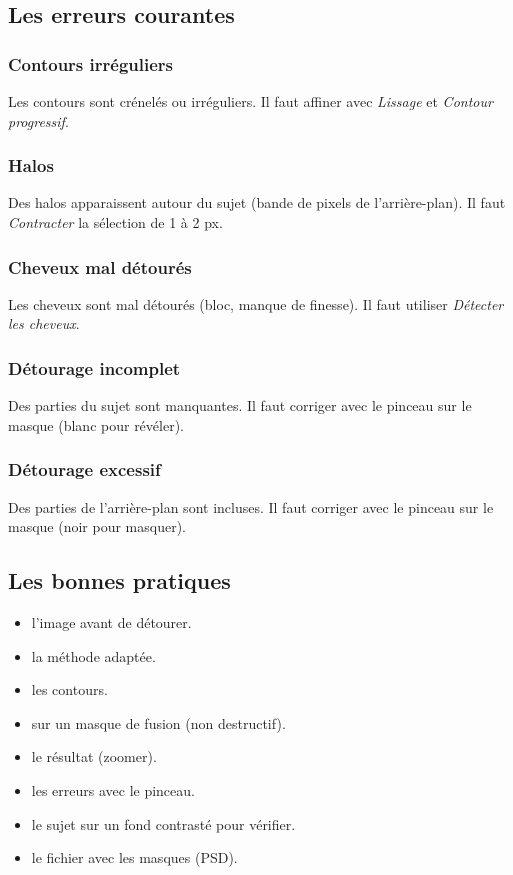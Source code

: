 \subsection{Les erreurs courantes}

\subsubsection{Contours irréguliers}

Les contours sont crénelés ou irréguliers. Il faut affiner avec \emph{Lissage} et \emph{Contour progressif}.

\subsubsection{Halos}

Des halos apparaissent autour du sujet (bande de pixels de l'arrière-plan). Il faut \emph{Contracter} la sélection de 1 à 2 px.

\subsubsection{Cheveux mal détourés}

Les cheveux sont mal détourés (bloc, manque de finesse). Il faut utiliser \emph{Détecter les cheveux}.

\subsubsection{Détourage incomplet}

Des parties du sujet sont manquantes. Il faut corriger avec le pinceau sur le masque (blanc pour révéler).

\subsubsection{Détourage excessif}

Des parties de l'arrière-plan sont incluses. Il faut corriger avec le pinceau sur le masque (noir pour masquer).

\subsection{Les bonnes pratiques}

\begin{itemize}
    \item {} l'image avant de détourer.
    \item {} la méthode adaptée.
    \item {} les contours.
    \item {} sur un masque de fusion (non destructif).
    \item {} le résultat (zoomer).
    \item {} les erreurs avec le pinceau.
    \item {} le sujet sur un fond contrasté pour vérifier.
    \item {} le fichier avec les masques (PSD).
\end{itemize}

